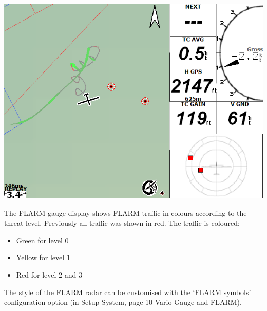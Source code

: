 \documentclass[a4paper,12pt]{refrep}
\begin{document}
\begin{center}
\includegraphics[angle=0,width=\linewidth,keepaspectratio='true']{figures/flarmrose.png}
\end{center}

The FLARM gauge display shows FLARM traffic in colours according to
the threat level.  Previously all traffic was shown in red. The
traffic is coloured:
\begin{itemize}
\item Green for level 0 
\item Yellow for level 1
\item Red for level 2 and 3
\end{itemize}

The style of the FLARM radar can be customised with the `FLARM
symbols' configuration option (in Setup System, page 10 Vario Gauge
and FLARM). %
\end{document}

